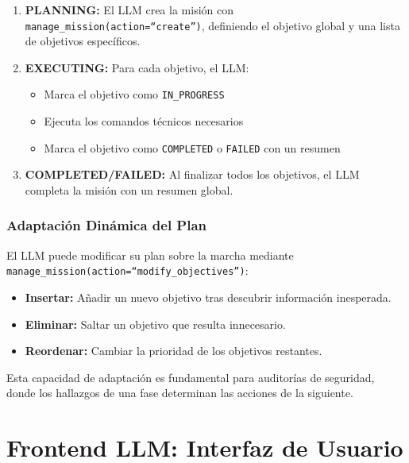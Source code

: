 \begin{enumerate}
    \item \textbf{PLANNING:} El LLM crea la misión con \texttt{manage\_mission(action=``create'')}, definiendo el objetivo global y una lista de objetivos específicos.
    
    \item \textbf{EXECUTING:} Para cada objetivo, el LLM:
    \begin{itemize}
        \item Marca el objetivo como \texttt{IN\_PROGRESS}
        \item Ejecuta los comandos técnicos necesarios
        \item Marca el objetivo como \texttt{COMPLETED} o \texttt{FAILED} con un resumen
    \end{itemize}
    
    \item \textbf{COMPLETED/FAILED:} Al finalizar todos los objetivos, el LLM completa la misión con un resumen global.
\end{enumerate}

\subsubsection{Adaptación Dinámica del Plan}

El LLM puede modificar su plan sobre la marcha mediante \texttt{manage\_mission(action=``modify\_objectives'')}:

\begin{itemize}
    \item \textbf{Insertar:} Añadir un nuevo objetivo tras descubrir información inesperada.
    \item \textbf{Eliminar:} Saltar un objetivo que resulta innecesario.
    \item \textbf{Reordenar:} Cambiar la prioridad de los objetivos restantes.
\end{itemize}

Esta capacidad de adaptación es fundamental para auditorías de seguridad, donde los hallazgos de una fase determinan las acciones de la siguiente.


\section{Frontend LLM: Interfaz de Usuario}
\label{sec:frontend_llm}


